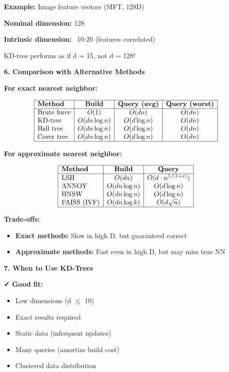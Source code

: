 \documentclass[12pt]{article}
\begin{document}
\begin{explanation}
\textbf{Example:} Image feature vectors (SIFT, 128D)

\textbf{Nominal dimension:} 128

\textbf{Intrinsic dimension:} ~10-20 (features correlated)

KD-tree performs as if d = 15, not d = 128!

\textbf{6. Comparison with Alternative Methods}

\textbf{For exact nearest neighbor:}

\[
\begin{array}{|l|c|c|c|}
\hline
\textbf{Method} & \textbf{Build} & \textbf{Query (avg)} & \textbf{Query (worst)} \\
\hline
\text{Brute force} & O(1) & O(dn) & O(dn) \\
\text{KD-tree} & O(dn \log n) & O(d \log n) & O(dn) \\
\text{Ball tree} & O(dn \log n) & O(d \log n) & O(dn) \\
\text{Cover tree} & O(dn \log n) & O(d \log n) & O(dn) \\
\hline
\end{array}
\]

\textbf{For approximate nearest neighbor:}

\[
\begin{array}{|l|c|c|}
\hline
\textbf{Method} & \textbf{Build} & \textbf{Query} \\
\hline
\text{LSH} & O(dn) & O(d \cdot n^{1/(1+\varepsilon)}) \\
\text{ANNOY} & O(dn \log n) & O(d \log n) \\
\text{HNSW} & O(dn \log n) & O(d \log n) \\
\text{FAISS (IVF)} & O(dn \log k) & O(d \sqrt{n}) \\
\hline
\end{array}
\]

\textbf{Trade-offs:}
\begin{itemize}
    \item \textbf{Exact methods:} Slow in high D, but guaranteed correct
    \item \textbf{Approximate methods:} Fast even in high D, but may miss true NN
\end{itemize}

\textbf{7. When to Use KD-Trees}

\textbf{✓ Good fit:}
\begin{itemize}
    \item Low dimensions (d $\leq$ 10)
    \item Exact results required
    \item Static data (infrequent updates)
    \item Many queries (amortize build cost)
    \item Clustered data distribution
\end{itemize}


\end{explanation}
\end{document}
